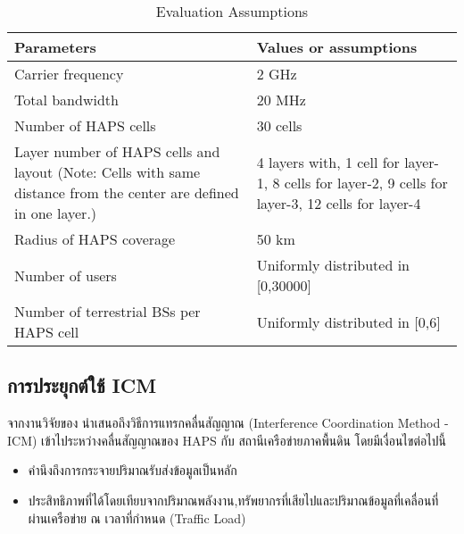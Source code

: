 \begin{table}[h]
\centering
\begin{tabular}[h]{| l | l |}
\hline
Parameters                      & Values or assumptions \\
\hline
Carrier frequency               & 2 GHz \\
\hline
Total bandwidth                 & 20 MHz \\
\hline
Number of HAPS cells            & 30 cells \\
\hline
\parbox[t]{12em}{Layer number of HAPS cells and layout (Note: Cells with same distance from the center are defined in one layer.)}        & \parbox[t]{12em}{4 layers with, 1 cell for layer-1, 8 cells for layer-2, 9 cells for layer-3, 12 cells for layer-4} \\
\hline
Radius of HAPS coverage         & 50 km \\
\hline
Number of users                 & Uniformly distributed in [0,30000] \\
\hline
Number of terrestrial BSs per HAPS cell & Uniformly distributed in [0,6]\\
\hline
\end{tabular}
\caption{Evaluation Assumptions} \label{table:04-haps-evaluation}
\end{table}

\subsection{การประยุกต์ใช้ ICM}

จากงานวิจัยของ \cite[Interference Coordination Method for Integrated HAPS-Terrestrial Networks]{liu2021interference}
นำเสนอถึงวิธีการแทรกคลื่นสัญญาณ (Interference Coordination Method - ICM) เข้าไประหว่างคลื่นสัญญาณของ HAPS กับ สถานีเครือข่ายภาคพื้นดิน โดยมีเงื่อนไขต่อไปนี้
\begin{itemize}
    \item คำนึงถึงการกระจายปริมาณรับส่งข้อมูลเป็นหลัก 
    \item ประสิทธิภาพที่ได้โดยเทียบจากปริมาณพลังงาน,ทรัพยากรที่เสียไปและปริมาณข้อมูลที่เคลื่อนที่ผ่านเครือข่าย ณ เวลาที่กำหนด (Traffic Load)
\end{itemize}
